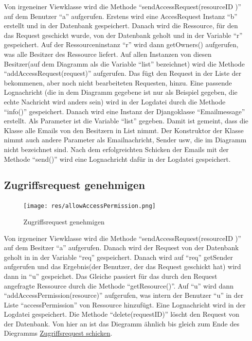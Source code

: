\documentclass[parskip=full,11pt]{scrartcl}
\begin{document}
Von irgeneiner Viewklasse wird die Methode \enquote{sendAccessRequest(resourceID )} auf dem Benutzer \enquote{a}  aufgerufen. Erstens wird eine AccesRequest Instanz \enquote{b} erstellt und in der Datenbank gespeichert. Danach wird die Ressource, für den das Request geschickt wurde, von der Datenbank geholt und in der Variable \enquote{r} gespeichert. Auf der Ressourceninstanz \enquote{r} wird dann getOwners() aufgerufen, was alle Besitzer des Ressource liefert. Auf allen Instanzen von diesen Besitzer(auf dem Diagramm als die Variable \enquote{list} bezeichnet) wird die Methode  \enquote{addAccessRequest(request)} aufgerufen. Das fügt den Request in der Liste der bekommenen, aber noch nicht bearbeiteten Requesten, hinzu. Eine passende Lognachricht (die in dem Diagramm gegebene ist nur als Beispiel gegeben, die echte Nachricht wird anders sein) wird in der Logdatei durch die Methode \enquote{info()} gespeichert. Danach wird eine Instanz der Djangoklasse \enquote{Emailmessage} erstellt. Als Parameter ist die Variable \enquote{list} gegeben. Damit ist gemeint, dass die Klasse alle Emails von den Besitzern in List nimmt. Der Konstruktor der Klasse nimmt auch andere Parameter als Emailnachricht, Sender usw, die im Diagramm nicht bezeichnet sind. Nach dem erfolgreichten Schicken der Emails mit der Methode  \enquote{send()} wird eine Lognachricht dafür in der Logdatei gespeichert. 
 
  \newpage
 \subsection{Zugriffsrequest genehmigen}
 \begin{figure}[ht!]
 	\centering
 	\texttt{[image: res/allowAccessPermission.png]}
 	\caption{Zugriffsrequest genehmigen}
 \end{figure}
 
 Von irgeneiner Viewklasse wird die Methode \enquote{sendAccessRequest(resourceID )} auf dem Besitzer \enquote{a}  aufgerufen. Danach wird der Request von der Datenbank geholt in in der Variable \enquote{req} gespeichert. Danach wird auf \enquote{req} getSender aufgerufen und das Ergebnis(der Benutzer, der das Request geschickt hat) wird dann in \enquote{u} gespeichet. Das Gleiche passiert für das durch den Request angefragte Ressource durch die Methode \enquote{getResource()}. Auf \enquote{u} wird dann \enquote{addAccessPermission(resource)} aufgerufen, was intern der Benutzer \enquote{u} in der Liste \enquote{accessPermission} von Ressource hinzufügt. Eine Lognachricht wird in der Logdatei gespeichert. Die Methode \enquote{delete(requestID)} löscht den Request von der Datenbank. Von hier an ist das Diegramm ähnlich bis gleich zum Ende des Diegramms \hyperref[fig:sendAccReq]{Zugriffsrequest schicken}. 
 
\end{document}
